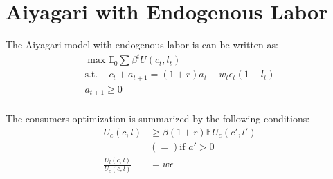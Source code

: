 \documentclass[12pt]{article}
\begin{document}
\newpage
\section{Aiyagari with Endogenous Labor}
The Aiyagari model with endogenous labor is can be written as:
\begin{align*}
\max \mathbb{E}_0 \sum \beta^t U(c_t, l_t) \\
\text{s.t.  } \;\;\; c_t + a_{t+1} = (1+r)a_t + w_t \epsilon_t (1-l_t) \\
a_{t+1} \geq 0\\
\end{align*}

The consumers optimization is summarized by the following conditions:
\begin{align*}
U_c(c, l) & \geq \beta(1+r) \mathbb{E} U_c(c', l')\\
&(= ) \text{if  } a' >0 \\
\frac{U_l(c, l)}{U_c(c, l)} & = w \epsilon
\end{align*}
\end{document}
